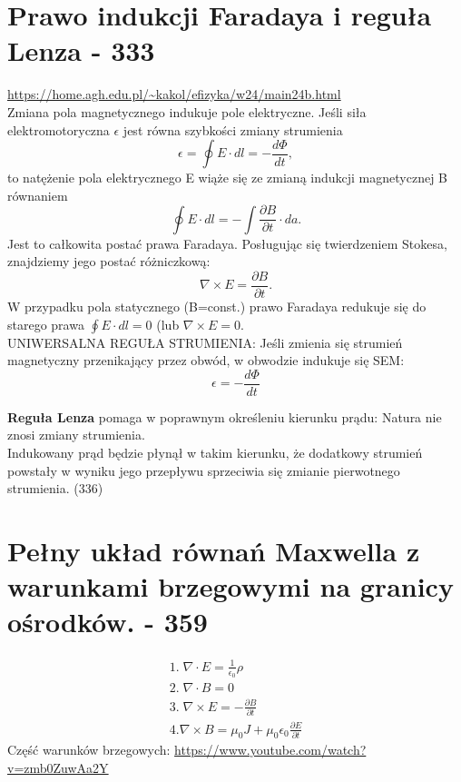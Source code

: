 \documentclass{article}
\begin{document}
\section{Prawo indukcji Faradaya i reguła Lenza - 333}
\url{https://home.agh.edu.pl/~kakol/efizyka/w24/main24b.html} \\

Zmiana pola magnetycznego indukuje pole elektryczne. Jeśli siła elektromotoryczna $\epsilon$ jest równa szybkości zmiany strumienia
\begin{equation*}
    \epsilon = \oint E\cdot dl = - \frac{d\Phi}{dt},
\end{equation*}
to natężenie pola elektrycznego E wiąże się ze zmianą indukcji magnetycznej B równaniem
\begin{equation*}
    \oint E\cdot dl = - \int \frac{\partial B}{\partial t}\cdot da.
\end{equation*}
Jest to całkowita postać prawa Faradaya. Posługując się twierdzeniem Stokesa, znajdziemy jego postać różniczkową:
\begin{equation*}
    \nabla \times E = \frac{\partial B}{\partial t}.
\end{equation*}
W przypadku pola statycznego (B=const.) prawo Faradaya redukuje się do starego prawa $\oint E\cdot dl=0$ (lub $\nabla \times E=0$. \\
UNIWERSALNA REGUŁA STRUMIENIA: Jeśli zmienia się strumień magnetyczny przenikający przez obwód, w obwodzie indukuje się SEM:
\begin{equation*}
    \epsilon = -\frac{d\Phi}{dt}
\end{equation*}

\textbf{Reguła Lenza} pomaga w poprawnym określeniu kierunku prądu: Natura nie znosi zmiany strumienia. \\
Indukowany prąd będzie płynął w takim kierunku, że dodatkowy strumień powstały w wyniku jego przepływu sprzeciwia się zmianie pierwotnego strumienia. (336)

\section{Pełny układ równań Maxwella z warunkami brzegowymi na granicy ośrodków. - 359}

\begin{gather*}
    1. \; \nabla \cdot E = \frac{1}{\epsilon_0}\rho \\
    2. \; \nabla \cdot B = 0 \\
    3. \; \nabla \times E = - \frac{\partial B}{\partial t} \\
    4. \nabla \times B = \mu_0 J + \mu_0\epsilon_0\frac{\partial E}{\partial t}
\end{gather*}
Część warunków brzegowych: \url{https://www.youtube.com/watch?v=zmb0ZuwAa2Y}
\end{document}
